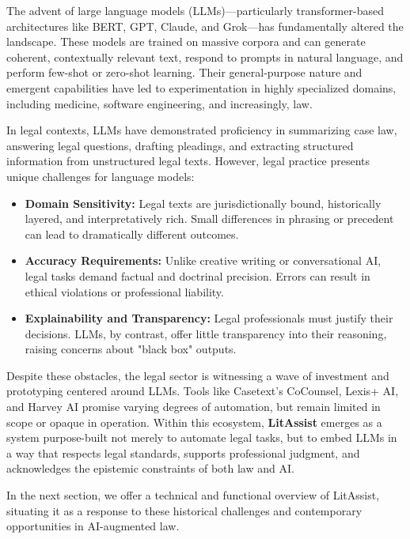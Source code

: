 \documentclass[12pt,a4paper]{article}
\begin{document}
The advent of large language models (LLMs)—particularly transformer-based architectures like BERT, GPT, Claude, and Grok—has fundamentally altered the landscape. These models are trained on massive corpora and can generate coherent, contextually relevant text, respond to prompts in natural language, and perform few-shot or zero-shot learning. Their general-purpose nature and emergent capabilities have led to experimentation in highly specialized domains, including medicine, software engineering, and increasingly, law.

In legal contexts, LLMs have demonstrated proficiency in summarizing case law, answering legal questions, drafting pleadings, and extracting structured information from unstructured legal texts. However, legal practice presents unique challenges for language models:

\begin{itemize}
\item \textbf{Domain Sensitivity:} Legal texts are jurisdictionally bound, historically layered, and interpretatively rich. Small differences in phrasing or precedent can lead to dramatically different outcomes.

\item \textbf{Accuracy Requirements:} Unlike creative writing or conversational AI, legal tasks demand factual and doctrinal precision. Errors can result in ethical violations or professional liability.

\item \textbf{Explainability and Transparency:} Legal professionals must justify their decisions. LLMs, by contrast, offer little transparency into their reasoning, raising concerns about "black box" outputs.
\end{itemize}

Despite these obstacles, the legal sector is witnessing a wave of investment and prototyping centered around LLMs. Tools like Casetext's CoCounsel, Lexis+ AI, and Harvey AI promise varying degrees of automation, but remain limited in scope or opaque in operation. Within this ecosystem, \textbf{LitAssist} emerges as a system purpose-built not merely to automate legal tasks, but to embed LLMs in a way that respects legal standards, supports professional judgment, and acknowledges the epistemic constraints of both law and AI.

In the next section, we offer a technical and functional overview of LitAssist, situating it as a response to these historical challenges and contemporary opportunities in AI-augmented law.
\end{document}
